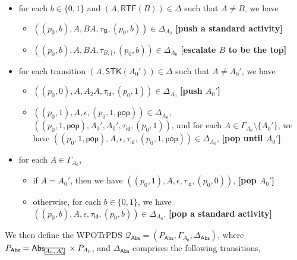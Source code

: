 \documentclass[preprint,12pt]{elsarticle}
\newcommand\rectangled[1]{\tikz[baseline=(torect.base)]{
    \node[shape = rectangle, draw, inner sep=0pt, outer sep = 0pt] (torect) {#1}
    }
}
\newcommand{\mrectangled}[1]{\text{\rectangled{\ensuremath{#1}}}}
\newcommand{\mhcancel}[1]{\mrectangled{#1}}
\newcommand\Qq{{\mathcal{Q} }}
\newcommand\abs{{\mathsf{Abs} }}
\newcommand{\STK}{\mathsf{STK}}
\newcommand{\CTP}{\mathsf{CTP}}
\newcommand{\RTF}{\mathsf{RTF}}
\newcommand{\id}{\mathsf{id}}
\newcommand{\WOTrPDS}{\textsf{WPOTrPDS}}
\newcommand\pop{\mathsf{pop}}
\begin{document}
{{\begin{itemize}
\begin{itemize}
            \item $((p_0,1), A_0', BA_0', \tau_{\not B}, (p_0,1)) \in \Delta_{A_0}$, \textbf{[push a standard activity]}
            \item $((p_0,1), A_0', \varepsilon, \tau_{B}, (\langle B,\CTP\rangle,0)) \in \Delta_{A_0}$, 
        $((\langle B, \CTP\rangle,0), B, B, \tau_{id}, (p_0,0))  \in \Delta_{A_0}$, and for each $A' \in \Gamma_{A_0} \setminus \{B,A_0'\}$, $((\langle B, \CTP\rangle,0), A', \varepsilon, \tau_{\id}, (\langle B, \CTP\rangle,0)) \in \Delta_{A_0}$, \textbf{[pop until $B$]}
        \end{itemize}
    \item for each $b\in\{0,1\}$ and $(A, \RTF(B)) \in \Delta$ such that $A \neq B$, we have 
        \begin{itemize}
            \item $((p_0,b), A, BA, \tau_{\not B}, (p_0,b)) \in \Delta_{A_0}$ \textbf{[push a standard activity]}
            \item $((p_0,b), A, BA, \tau_{B, \dag}, (p_0,b)) \in \Delta_{A_0}$ \textbf{[escalate $B$ to be the top]}
        \end{itemize}
    \item for each transition $(A,\STK(A_0'))\in\Delta$ such that $A\neq A_0'$, we have 
        \begin{itemize}
            \item $((p_0,0),A,A_2A,\tau_{\id},(p_0,1))\in\Delta_{A_0}$ \textbf{[push $A_0'$]}
            \item $((p_0,1),A,\epsilon,(p_0,1,\pop))\in\Delta_{A_0}$, $((p_0,1,\pop),A_0',A_0',\tau_{\id},(p_0,1))$, and for each $A\in\Gamma_{A_0}\setminus\{A_0'\}$, we have $((p_0,1,\pop),A,\epsilon,\tau_{\id},(p_0,1,\pop))\in\Delta_{A_0}$, \textbf{[pop until $A_0'$]}
        \end{itemize}
    \item for each $A\in\Gamma_{A_0}$, 
        \begin{itemize}
            \item if $A=A_0'$, then we have $((p_0,1),A,\epsilon,\tau_{\id},(p_0,0))$, \textbf{[pop $A_0'$]}
            \item otherwise, for each $b\in\{0,1\}$, we have $((p_0,b),A,\epsilon,\tau_{\id},(p_0,b))\in\Delta_{A_0}$. \textbf{[pop a standard activity]}
        \end{itemize}
\end{itemize}
}
We then define the {\WOTrPDS} $\Qq_{\abs} = (P_{\abs},\Gamma_{A_0},\Delta_{\abs})$, where $P_{\abs} = \abs_{\mhcancel{A_0,A_0'}}\times P_{A_0}$, and $\Delta_{\abs}$ comprises the following transitions,
}
\end{document}
